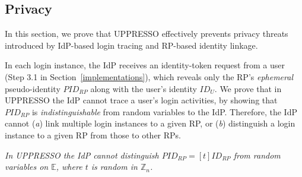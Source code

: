 {%

\subsection{Privacy}
\label{sec-:analysis}
In this section, we prove that UPPRESSO effectively prevents privacy threats introduced by IdP-based login tracing and RP-based identity linkage.

\newc In each login instance, the IdP receives an identity-token request from a user (Step 3.1 in Section~\ref{implementations}),
 which reveals only the RP's \emph{ephemeral} pseudo-identity $PID_{RP}$ along with the user's identity $ID_U$.
We prove that in UPPRESSO the IdP cannot trace a user's login activities,
 by showing that $PID_{RP}$ is \emph{indistinguishable} from random variables to the IdP.
Therefore,
    the IdP cannot (\emph{a}) link multiple login instances to a given RP,
        or (\emph{b}) distinguish a login instance to a given RP from those to other RPs.

\vspace{1mm}
 {\em In UPPRESSO the IdP cannot distinguish $PID_{RP} = [t]ID_{RP}$
    from random variables on $\mathbb{E}$, where $t$ is random in $\mathbb{Z}_n$.} %

\vspace{0.75mm}
}
